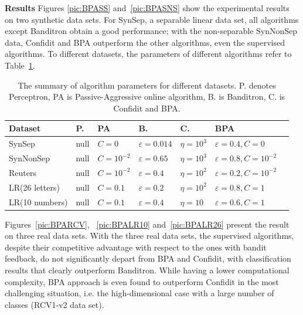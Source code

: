 \documentclass[preprint,12pt,authoryear]{elsarticle}
\begin{document}
\textbf{Results}
Figures \ref{pic:BPASS} and~\ref{pic:BPASNS} show the experimental results on two synthetic data sets. For SynSep, a separable linear data set, all algorithms except Banditron obtain a good performance; with the non-separable SynNonSep data, Confidit and BPA outperform the other algorithms, even the supervised algorithms.  To different datasets, the parameters of different algorithms refer to Table~\ref{table:bpa}.
\begin{table}[h]
	\caption{The summary of algorithm parameters for different datasets. P. denotes Perceptron, PA is Passive-Aggressive online algorithm, B. is Banditron, C. is Confidit and BPA.}
	\label{table:bpa}
	\begin{center}
		\begin{tabular}{lllllll}
			{\bf Dataset}  & {\bf P.} & {\bf PA } & {\bf B.}& {\bf C.} & {\bf BPA}\\
			\hline
			SynSep & null & $C=0$ & $\varepsilon = 0.014$ &$\eta = 10^3$ & $\varepsilon = 0.4,C = 0$\\
			
			SynNonSep & null & $C=10^{-2}$ & $\varepsilon =0.65$ & $\eta = 10^3$& $\varepsilon = 0.8,C = 10^{-2}$\\
			
			Reuters & null & $C=10^{-2}$ & $\varepsilon =0.4$ & $\eta = 10^2$ & $\varepsilon = 0.2,C = 10^{-2}$\\
			
			LR(26 letters) & null &  $C=0.1$ & $\varepsilon = 0.2$& $\eta=10^2$ & $\varepsilon = 0.8,C= 1$ \\
			
			LR(10 numbers) & null & $C=0.1$ & $\varepsilon= 0.4$& $\eta = 10$ & $\varepsilon = 0.6,C=1$\\
			
		\end{tabular}
	\end{center}
\end{table}


Figures~\ref{pic:BPARCV}, ~\ref{pic:BPALR10} and~\ref{pic:BPALR26} present the result on three real data sets. With the three real data sets, the supervised algorithms, despite their competitive advantage with respect to the ones with bandit feedback, do not significantly depart from BPA and Confidit, with classification results that clearly outperform Banditron. While having a lower computational complexity, BPA approach is even found to outperform Confidit in the most challenging situation, i.e. the high-dimensional case with a large number of classes (RCV1-v2 data set).
\end{document}
